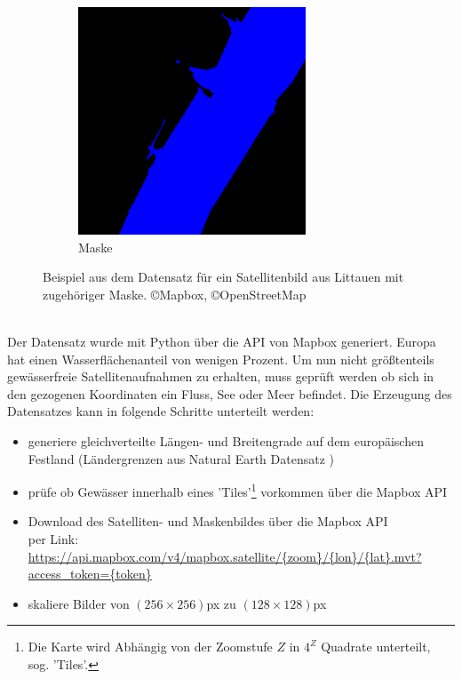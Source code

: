 \begin{figure}
\begin{subfigure}{0.2\textwidth}
        \includegraphics[width=\textwidth]{content/img/datensatz_mask.png}
        \caption{Maske}
    \end{subfigure}
    \caption{Beispiel aus dem Datensatz für ein Satellitenbild aus Littauen mit zugehöriger Maske. \copyright Mapbox, \copyright OpenStreetMap}
    \label{fig:datensatz}
\end{figure}
\\
Der Datensatz wurde mit Python über die API von Mapbox\cite{mapbox} generiert.
Europa hat einen Wasserflächenanteil von wenigen Prozent.
Um nun nicht größtenteils gewässerfreie Satellitenaufnahmen zu erhalten, muss geprüft werden ob sich in den gezogenen Koordinaten ein Fluss, See oder Meer befindet.
Die Erzeugung des Datensatzes kann in folgende Schritte unterteilt werden:
\begin{itemize}
    \item generiere gleichverteilte Längen- und Breitengrade auf dem europäischen Festland (Ländergrenzen aus Natural Earth Datensatz \cite{naturalearth})
    \item prüfe ob Gewässer innerhalb eines 'Tiles'\footnote{\label{foot:tiles}Die Karte wird Abhängig von der Zoomstufe $Z$ in $4^Z$ Quadrate unterteilt, sog. 'Tiles'.} vorkommen über die Mapbox API\cite{mapbox}
    \item Download des Satelliten- und Maskenbildes über die Mapbox API\cite{mapbox} \\
          per Link: \url{https://api.mapbox.com/v4/mapbox.satellite/{zoom}/{lon}/{lat}.mvt?access_token={token}}
    \item skaliere Bilder von $(256 \times 256)$px zu $(128 \times 128)$px
\end{itemize}
